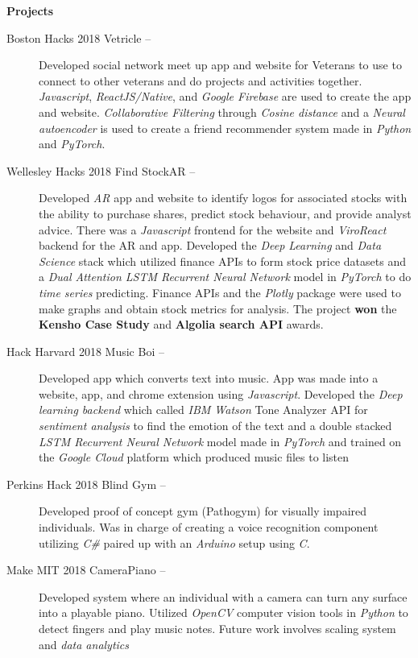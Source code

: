 \documentclass[letterpaper, 8pt]{extarticle}
\newcommand{\resheading}[1]{{\large \colorbox{mygrey}{\begin{minipage}{0.99\textwidth}{\textbf{#1 \vphantom{p\^{E}}}}\end{minipage}}}}
\begin{document}
\resheading{Projects}
\begin{description}
\item[Boston Hacks 2018 Vetricle --] Developed social network meet up app and website for Veterans to use to connect to other veterans and do projects and activities together. \emph{Javascript}, \emph{ReactJS/Native}, and \emph{Google Firebase} are used to create the app and website. \emph{Collaborative Filtering} through \emph{Cosine distance} and a \emph{Neural autoencoder} is used to create a friend recommender system made in \emph{Python} and \emph{PyTorch}. 


\item[Wellesley Hacks 2018 Find StockAR --]Developed \emph{AR} app and website to identify logos for associated stocks with the ability to purchase shares, predict stock behaviour, and provide analyst advice. There was a \emph{Javascript} frontend for the website and \emph{ViroReact} backend for the AR and app. Developed the \emph{Deep Learning} and \emph{Data Science} stack which utilized finance APIs to form stock price datasets and a \emph{Dual Attention LSTM Recurrent Neural Network} model in \emph{PyTorch} to do \emph{time series} predicting. Finance APIs and the \emph{Plotly} package were used to make graphs and obtain stock metrics for analysis. The project \textbf{won} the \textbf{Kensho Case Study} and \textbf{Algolia search API} awards.

\item[Hack Harvard 2018 Music Boi --] Developed app which converts text into music. App was made into a website, app, and chrome extension using \emph{Javascript}. Developed the \emph{Deep learning backend} which called \emph{IBM Watson} Tone Analyzer API for \emph{sentiment analysis} to find the emotion of the text and a double stacked \emph{LSTM Recurrent Neural Network} model made in \emph{PyTorch} and trained on the \emph{Google Cloud} platform which produced music files to listen

\item[Perkins Hack 2018 Blind Gym --]  Developed proof of concept gym (Pathogym) for visually impaired individuals. Was in charge of creating a voice recognition component utilizing \emph{C\#} paired up with an \emph{Arduino} setup using \emph{C}.

\item[Make MIT 2018 CameraPiano --] Developed system where an individual with a camera can turn any surface into a playable piano. Utilized \emph{OpenCV} computer vision tools in \emph{Python} to detect fingers and play music notes. Future work involves scaling system and \emph{data analytics}

\end{description}
\end{document}
